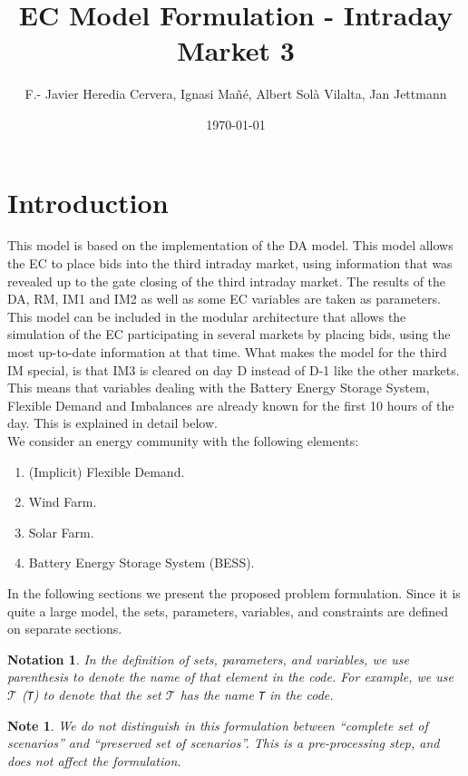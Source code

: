 \documentclass{article}
\title{EC Model Formulation - Intraday Market 3}
\author{F.- Javier Heredia Cervera, Ignasi Mañé, Albert Sol\`a Vilalta, Jan Jettmann}
\date{\today}
\newtheorem{notation}{Notation}[section]
\newtheorem{note}{Note}[section]
\begin{document}
\maketitle

\section{Introduction}
This model is based on the implementation of the DA model. This model allows the EC to place bids into the third intraday market, using information that was revealed up to the gate closing of the third intraday market. The results of the DA, RM, IM1 and IM2 as well as some EC variables are taken as parameters. This model can be included in the modular architecture that allows the simulation of the EC participating in several markets by placing bids, using the most up-to-date information at that time. What makes the model for the  third IM special, is that IM3 is cleared on day D instead of D-1 like the other markets. This means that variables dealing with the Battery Energy Storage System, Flexible Demand and Imbalances are already known for the first 10 hours of the day. This is explained in detail below.\\
We consider an energy community with the following elements:
\begin{enumerate}
	\item (Implicit) Flexible Demand.
	\item Wind Farm.
	\item Solar Farm.
	\item Battery Energy Storage System (BESS).
\end{enumerate}

In the following sections we present the proposed problem formulation. Since it is quite a large model, the sets, parameters, variables, and constraints are defined on separate sections.

\begin{notation}
	In the definition of sets, parameters, and variables, we use parenthesis to denote the name of that element in the code. For example, we use $\mathcal{T}$ (\verb|T|) to denote that the set $\mathcal{T}$ has the name \verb|T| in the code.  
\end{notation}

\begin{note} \label{NOTE:ScenarioTreatment}
	We do not distinguish in this formulation between ``complete set of scenarios'' and ``preserved set of scenarios''. This is a pre-processing step, and does not affect the formulation. 
\end{note}
\end{document}
